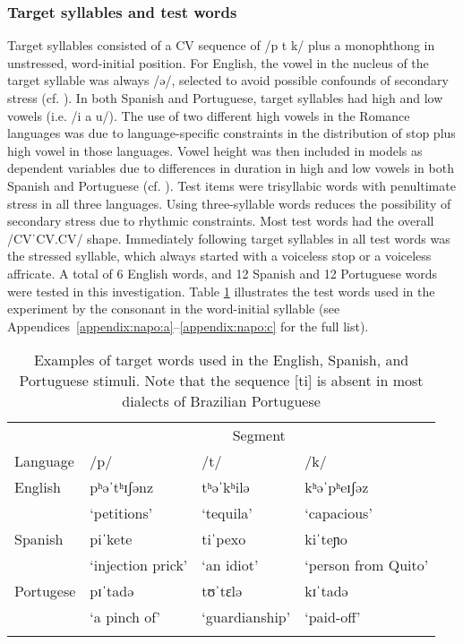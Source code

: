\documentclass[output=paper]{langscibook}
\begin{document}
\subsubsection{Target syllables and test words}

Target syllables consisted of a CV sequence of /p t k/ plus a monophthong in unstressed, word-initial position. For English, the vowel in the nucleus of the target syllable was always /ə/, selected to avoid possible confounds of secondary stress (cf. \citealt{ch88, d04}). In both Spanish and Portuguese, target syllables had high and low vowels (i.e. /i a u/). The use of two different high vowels in the Romance languages was due to language-specific constraints in the distribution of stop plus high vowel in those languages. Vowel height was then included in models as dependent variables due to differences in duration in high and low vowels in both Spanish and Portuguese (cf. \citealt{hn14, cssrc19}).
Test items were trisyllabic words with penultimate stress in all three languages. Using three-syllable words reduces the possibility of secondary stress due to rhythmic constraints. Most test words had the overall /CVˈCV.CV/ shape. Immediately following target syllables in all test words was the stressed syllable, which always started with a voiceless stop or a voiceless affricate. A total of 6 English words, and 12 Spanish and 12 Portuguese words were tested in this investigation. Table \ref{tab:table:1} illustrates the test words used in the experiment by the consonant in the word-initial syllable (see Appendices~\ref{appendix:napo:a}--\ref{appendix:napo:c} for the full list).



\begin{table}
\caption{Examples of target words used in the English, Spanish, and Portuguese stimuli. Note that the sequence [ti] is absent in most dialects of Brazilian Portuguese\label{tab:table:1}}
\begin{tabular}{llll}
\lsptoprule
               & \multicolumn{3}{c}{Segment}\\\cmidrule(lr){2-4}
       Language &	/p/	& /t/ &	/k/\\
\midrule
English   & pʰəˈtʰɪʃənz       & tʰəˈkʰilə     & kʰəˈpʰeɪʃəz\\
          & ‘petitions’       & ‘tequila’     &  ‘capacious’\\\addlinespace
Spanish   & piˈkete            & tiˈpexo       &   kiˈteɲo\\
          & ‘injection prick’  & ‘an idiot’    & ‘person from Quito’\\\addlinespace
Portugese &  pɪˈtadə          & tʊˈtɛlə        & kɪˈtadə\\
          &‘a pinch of’       & ‘guardianship’ & ‘paid-off’\\
\lspbottomrule
\end{tabular}
\end{table}
\end{document}
